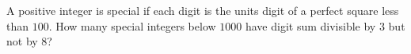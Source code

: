 A positive integer is special if each digit is the units digit of a perfect square less than $100$. How many special integers below $1000$ have digit sum divisible by $3$ but not by $8$?
